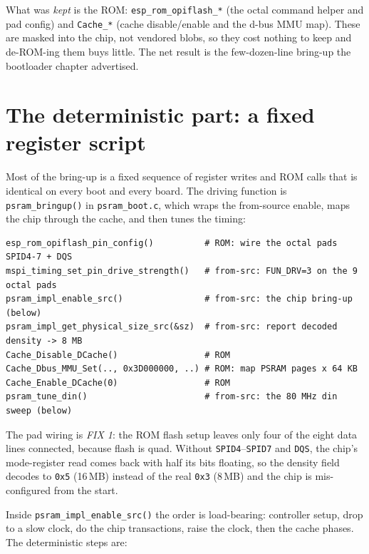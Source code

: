 What was \emph{kept} is the ROM: \texttt{esp\_rom\_opiflash\_*} (the octal command
helper and pad config) and \texttt{Cache\_*} (cache disable/enable and the d-bus MMU
map). These are masked into the chip, not vendored blobs, so they cost nothing to
keep and de-ROM-ing them buys little. The net result is the few-dozen-line bring-up
the bootloader chapter advertised.


\section{The deterministic part: a fixed register script}

Most of the bring-up is a fixed sequence of register writes and ROM calls that is
identical on every boot and every board. The driving function is
\texttt{psram\_bringup()} in \texttt{psram\_boot.c}, which wraps the from-source
enable, maps the chip through the cache, and then tunes the timing:

\begin{lstlisting}[style=sh]
esp_rom_opiflash_pin_config()          # ROM: wire the octal pads SPID4-7 + DQS
mspi_timing_set_pin_drive_strength()   # from-src: FUN_DRV=3 on the 9 octal pads
psram_impl_enable_src()                # from-src: the chip bring-up (below)
psram_impl_get_physical_size_src(&sz)  # from-src: report decoded density -> 8 MB
Cache_Disable_DCache()                 # ROM
Cache_Dbus_MMU_Set(.., 0x3D000000, ..) # ROM: map PSRAM pages x 64 KB
Cache_Enable_DCache(0)                 # ROM
psram_tune_din()                       # from-src: the 80 MHz din sweep (below)
\end{lstlisting}

The pad wiring is \emph{FIX 1}: the ROM flash setup leaves only four of the eight
data lines connected, because flash is quad. Without \texttt{SPID4}--\texttt{SPID7}
and \texttt{DQS}, the chip's mode-register read comes back with half its bits
floating, so the density field decodes to \texttt{0x5} (16\,MB) instead of the real
\texttt{0x3} (8\,MB) and the chip is mis-configured from the start.

Inside \texttt{psram\_impl\_enable\_src()} the order is load-bearing: controller
setup, drop to a slow clock, do the chip transactions, raise the clock, then the
cache phases. The deterministic steps are:

